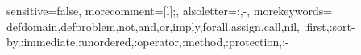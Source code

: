 {
  sensitive=false,    %
  morecomment=[l]{;}, %
  alsoletter={:,-},   %
  morekeywords={
    defdomain,defproblem,not,and,or,imply,forall,assign,call,nil,
    :first,:sort-by,:immediate,:unordered,:operator,:method,:protection,:-
  }
}